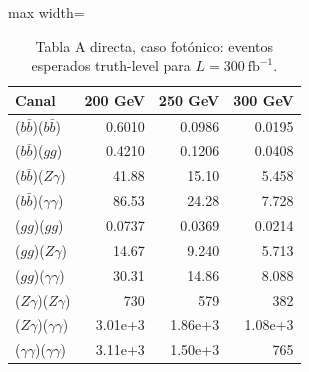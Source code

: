 \documentclass[10pt]{article}
\begin{document}
\begin{table}[H]
\centering
\small
\caption{Tabla A directa, caso fotónico: eventos esperados truth-level para $L=300~\mathrm{fb}^{-1}$.}
\label{tab:A_fotonico}
\begin{adjustbox}{max width=\textwidth}
\begin{tabular}{lrrr}
\toprule
Canal & 200 GeV & 250 GeV & 300 GeV \\
\midrule
($b\bar b$)($b\bar b$) & 0.6010 & 0.0986 & 0.0195 \\
($b\bar b$)($gg$) & 0.4210 & 0.1206 & 0.0408 \\
($b\bar b$)($Z\gamma$) & 41.88 & 15.10 & 5.458 \\
($b\bar b$)($\gamma\gamma$) & 86.53 & 24.28 & 7.728 \\
($gg$)($gg$) & 0.0737 & 0.0369 & 0.0214 \\
($gg$)($Z\gamma$) & 14.67 & 9.240 & 5.713 \\
($gg$)($\gamma\gamma$) & 30.31 & 14.86 & 8.088 \\
($Z\gamma$)($Z\gamma$) & 730 & 579 & 382 \\
($Z\gamma$)($\gamma\gamma$) & 3.01e+3 & 1.86e+3 & 1.08e+3 \\
($\gamma\gamma$)($\gamma\gamma$) & 3.11e+3 & 1.50e+3 & 765 \\
\bottomrule
\end{tabular}
\end{adjustbox}
\end{table}
\end{document}
